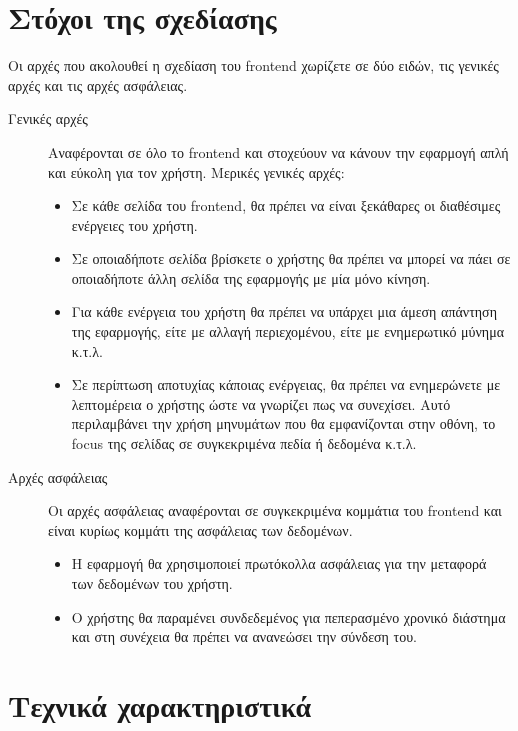 \section{Στόχοι της σχεδίασης}
Οι αρχές που ακολουθεί η σχεδίαση του frontend χωρίζετε σε δύο ειδών, τις γενικές αρχές και τις αρχές ασφάλειας.
\begin{description}
\item [Γενικές αρχές] Αναφέρονται σε όλο το frontend και στοχεύουν να κάνουν την εφαρμογή απλή και εύκολη για τον χρήστη.
\newline
Μερικές γενικές αρχές:


\begin{itemize}
  \item Σε κάθε σελίδα του frontend, θα πρέπει να είναι ξεκάθαρες οι διαθέσιμες ενέργειες του χρήστη.
  \item Σε οποιαδήποτε σελίδα βρίσκετε ο χρήστης θα πρέπει να μπορεί να πάει σε οποιαδήποτε άλλη σελίδα της εφαρμογής με μία μόνο κίνηση.
   \item Για κάθε ενέργεια του χρήστη θα πρέπει να υπάρχει μια άμεση απάντηση της εφαρμογής, είτε με αλλαγή περιεχομένου, είτε με ενημερωτικό μύνημα κ.τ.λ.
   \item Σε περίπτωση αποτυχίας κάποιας ενέργειας, θα πρέπει να ενημερώνετε με λεπτομέρεια ο χρήστης ώστε να γνωρίζει πως να συνεχίσει. Αυτό περιλαμβάνει την χρήση μηνυμάτων που θα εμφανίζονται στην οθόνη, το focus της σελίδας σε συγκεκριμένα πεδία ή δεδομένα κ.τ.λ.
\end{itemize}


\item [Αρχές ασφάλειας] Οι αρχές ασφάλειας αναφέρονται σε συγκεκριμένα κομμάτια του frontend και είναι κυρίως κομμάτι της ασφάλειας των δεδομένων.

\begin{itemize}
  \item Η εφαρμογή θα χρησιμοποιεί πρωτόκολλα ασφάλειας για την μεταφορά των δεδομένων του χρήστη.
  \item Ο χρήστης θα παραμένει συνδεδεμένος για πεπερασμένο χρονικό διάστημα και στη συνέχεια θα πρέπει να ανανεώσει την σύνδεση του.
\end{itemize}

\end{description}

\section{Τεχνικά χαρακτηριστικά}

